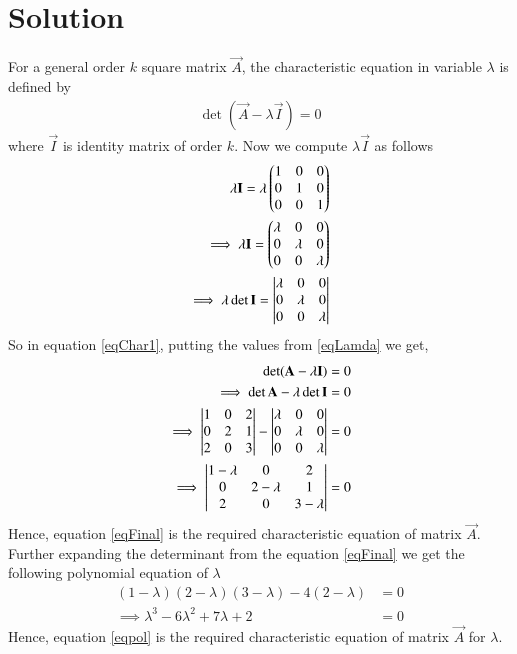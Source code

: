 \documentclass[journal,12pt,twocolumn]{IEEEtran}
\begin{document}
\section{Solution}
For a general order $k$ square matrix $\vec{A}$, the characteristic equation in variable $\lambda$ is defined by
\begin{align}
\det({\vec{A}-\lambda \vec{I}}) = 0\label{eqChar1}
\end{align}
where $\vec{I}$ is identity matrix of order $k$. Now we compute $\lambda \vec{I}$ as follows
\begin{align}
\lambda \mathbf{I} = \lambda \begin{pmatrix}1&0&0\\0&1&0\\0&0&1\end{pmatrix}\\
\implies\lambda \mathbf{I} = \begin{pmatrix}\lambda &0&0\\0&\lambda &0\\0&0&\lambda\end{pmatrix}\\
\implies\lambda\det{\mathbf{I}} = \begin{vmatrix}\lambda &0&0\\0&\lambda &0\\0&0&\lambda\end{vmatrix}\label{eqLamda}
\end{align}
So in equation \ref{eqChar1}, putting the values from \ref{eqLamda} we get,
\begin{align}
\det({\mathbf{A}-\lambda \mathbf{I}}) &= 0\\
\implies\det{\mathbf{A}}-\lambda \det{\mathbf{I}} &= 0\\
\implies\begin{vmatrix}1&0&2\\0&2&1\\2&0&3\end{vmatrix}-\begin{vmatrix}\lambda &0&0\\0&\lambda &0\\0&0&\lambda \end{vmatrix} &= 0\\
\implies\begin{vmatrix}1-\lambda &0&2\\0&2-\lambda &1\\2&0& 3-\lambda\end{vmatrix} &= 0\label{eqFinal}
\end{align}
Hence, equation \ref{eqFinal} is the required characteristic equation of matrix $\vec{A}$. Further expanding the determinant from the equation \ref{eqFinal} we get the following polynomial equation of $\lambda$ 
\begin{align}
(1-\lambda )(2-\lambda)(3-\lambda)-4(2-\lambda) &= 0\\
\implies\lambda^3-6\lambda^2+7\lambda+2 &=0\label{eqpol}
\end{align}
Hence, equation \ref{eqpol} is the required characteristic equation of matrix $\vec{A}$ for $\lambda$.
\end{document}
